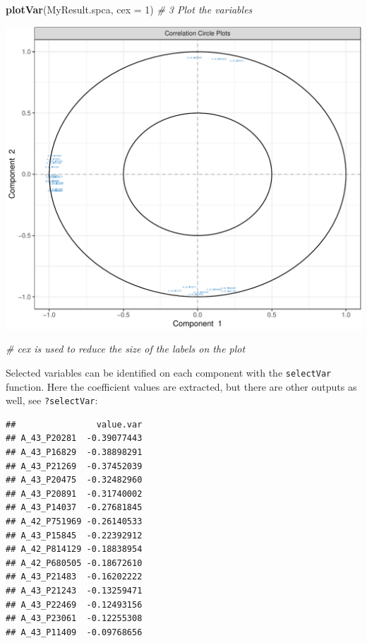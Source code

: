 \documentclass[]{book}
\newenvironment{Shaded}{\begin{snugshade}}{\end{snugshade}}
\newcommand{\CommentTok}[1]{\textcolor[rgb]{0.56,0.35,0.01}{\textit{#1}}}
\newcommand{\DataTypeTok}[1]{\textcolor[rgb]{0.13,0.29,0.53}{#1}}
\newcommand{\DecValTok}[1]{\textcolor[rgb]{0.00,0.00,0.81}{#1}}
\newcommand{\KeywordTok}[1]{\textcolor[rgb]{0.13,0.29,0.53}{\textbf{#1}}}
\newcommand{\NormalTok}[1]{#1}
\newcommand{\OperatorTok}[1]{\textcolor[rgb]{0.81,0.36,0.00}{\textbf{#1}}}
\begin{document}
\begin{Shaded}
\begin{Highlighting}[]
\KeywordTok{plotVar}\NormalTok{(MyResult.spca, }\DataTypeTok{cex =} \DecValTok{1}\NormalTok{)                                        }\CommentTok{# 3 Plot the variables}
\end{Highlighting}
\end{Shaded}

\begin{center}\includegraphics[width=0.5\linewidth,]{Figures/03-pca-liver-plotIndiv-args-2} \end{center}

\begin{Shaded}
\begin{Highlighting}[]
\CommentTok{# cex is used to reduce the size of the labels on the plot}
\end{Highlighting}
\end{Shaded}

Selected variables can be identified on each component with the \texttt{selectVar} function. Here the coefficient values are extracted, but there are other outputs as well, see \texttt{?selectVar}:

\begin{Shaded}
\end{Shaded}

\begin{verbatim}
##                value.var
## A_43_P20281  -0.39077443
## A_43_P16829  -0.38898291
## A_43_P21269  -0.37452039
## A_43_P20475  -0.32482960
## A_43_P20891  -0.31740002
## A_43_P14037  -0.27681845
## A_42_P751969 -0.26140533
## A_43_P15845  -0.22392912
## A_42_P814129 -0.18838954
## A_42_P680505 -0.18672610
## A_43_P21483  -0.16202222
## A_43_P21243  -0.13259471
## A_43_P22469  -0.12493156
## A_43_P23061  -0.12255308
## A_43_P11409  -0.09768656
\end{verbatim}
\end{document}
